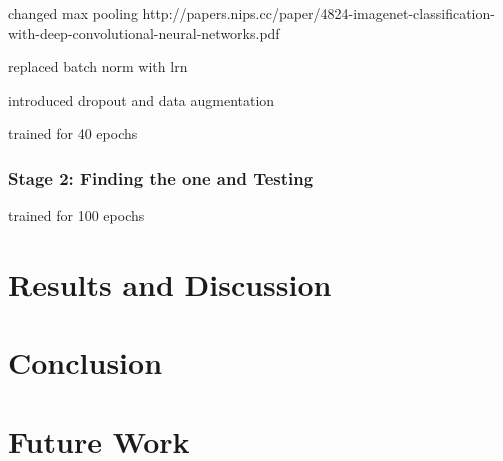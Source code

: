 \documentclass[]{article}
\begin{document}
changed max pooling
http://papers.nips.cc/paper/4824-imagenet-classification-with-deep-convolutional-neural-networks.pdf

replaced batch norm with lrn

introduced dropout and data augmentation

trained for 40 epochs


\subsubsection{Stage 2: Finding the one and Testing}

trained for 100 epochs
 
 
\section{Results and Discussion}

\section{Conclusion}

\section{Future Work}


\clearpage
\medskip


\end{document}
